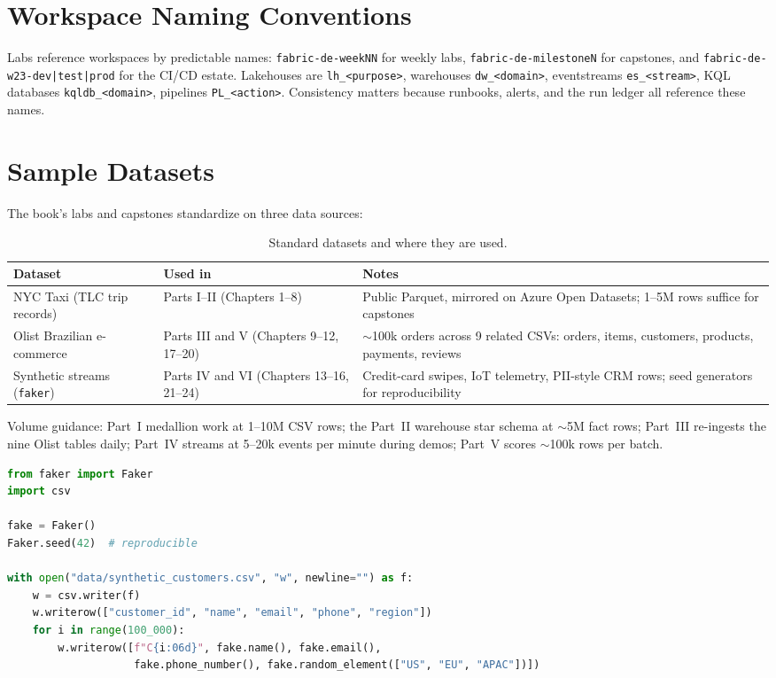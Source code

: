 \section{Workspace Naming Conventions}
%
Labs reference workspaces by predictable names: \texttt{fabric-de-weekNN} for weekly labs,
\texttt{fabric-de-milestoneN} for capstones, and \texttt{fabric-de-w23-dev|test|prod} for the CI/CD
estate. Lakehouses are \texttt{lh\_<purpose>}, warehouses \texttt{dw\_<domain>}, eventstreams
\texttt{es\_<stream>}, KQL databases \texttt{kqldb\_<domain>}, pipelines \texttt{PL\_<action>}.
Consistency matters because runbooks, alerts, and the run ledger all reference these names.

\section{Sample Datasets}
%
The book's labs and capstones standardize on three data sources:

\begin{table}[H]
\centering
\small
\begin{tabular}{@{}p{3.2cm}p{4.6cm}p{5.8cm}@{}}
\toprule
\textbf{Dataset} & \textbf{Used in} & \textbf{Notes} \\
\midrule
NYC Taxi (TLC trip records) & Parts I--II (Chapters 1--8) & Public Parquet, mirrored on Azure Open Datasets; 1--5M rows suffice for capstones \\
Olist Brazilian e-commerce & Parts III and V (Chapters 9--12, 17--20) & $\sim$100k orders across 9 related CSVs: orders, items, customers, products, payments, reviews \\
Synthetic streams (\texttt{faker}) & Parts IV and VI (Chapters 13--16, 21--24) & Credit-card swipes, IoT telemetry, PII-style CRM rows; seed generators for reproducibility \\
\bottomrule
\end{tabular}
\caption{Standard datasets and where they are used.}
\label{tab:appendixa-datasets}
\end{table}

Volume guidance: Part~I medallion work at 1--10M CSV rows; the Part~II warehouse star schema at
$\sim$5M fact rows; Part~III re-ingests the nine Olist tables daily; Part~IV streams at
5--20k events per minute during demos; Part~V scores $\sim$100k rows per batch.

\begin{lstlisting}[language=Python,caption={Seeded synthetic PII generator (commit the script, not the data).},label={lst:appendixa-faker}]
from faker import Faker
import csv

fake = Faker()
Faker.seed(42)  # reproducible

with open("data/synthetic_customers.csv", "w", newline="") as f:
    w = csv.writer(f)
    w.writerow(["customer_id", "name", "email", "phone", "region"])
    for i in range(100_000):
        w.writerow([f"C{i:06d}", fake.name(), fake.email(),
                    fake.phone_number(), fake.random_element(["US", "EU", "APAC"])])
\end{lstlisting}

